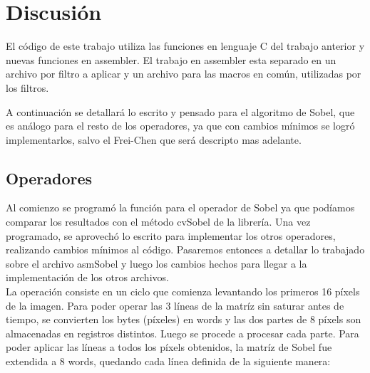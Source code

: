 \section{Discusi\'on}

El c\'odigo de este trabajo utiliza las funciones en lenguaje C del trabajo anterior y nuevas funciones en assembler. El trabajo en assembler esta separado en un archivo por filtro a aplicar y un  archivo para las macros en com\'un, utilizadas por los filtros.
	
A continuaci\'on se detallar\'a lo escrito y pensado para el algoritmo de Sobel, que es an\'alogo para el resto de los operadores, ya que con cambios m\'inimos se logr\'o implementarlos, salvo el Frei-Chen que ser\'a descripto mas adelante. \\

\subsection{Operadores}

Al comienzo se program\'o la funci\'on para el operador de Sobel ya que pod\'iamos comparar los resultados con el m\'etodo cvSobel de la librer\'ia. Una vez programado, se aprovech\'o lo escrito para implementar los otros operadores, realizando cambios m\'inimos al c\'odigo. Pasaremos entonces a detallar lo trabajado sobre el archivo asmSobel y luego los cambios hechos para llegar a la implementaci\'on de los otros archivos. \\

\noindent La operaci\'on consiste en un ciclo que comienza levantando los primeros 16 p\'ixels de la imagen. Para poder operar las 3 l\'ineas de la matr\'iz sin saturar antes de tiempo, se convierten los bytes (p\'ixeles) en words y las dos partes de 8 p\'ixels son almacenadas en registros distintos. Luego se procede a procesar cada parte. Para poder aplicar las l\'ineas a todos los p\'ixels obtenidos, la matr\'iz de Sobel fue extendida a 8 words, quedando cada l\'inea definida de la siguiente manera: \\


